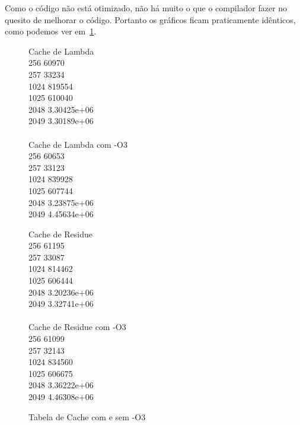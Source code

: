 \documentclass[12pt]{article}
\begin{document}
Como o código não está otimizado, não há muito o que o compilador fazer no 
quesito de melhorar o código. Portanto os gráficos ficam praticamente 
idênticos, como podemos ver em~\ref{fig:tabCache}.

\begin{figure}[ht]\footnotesize
\begin{tt}\noindent
\begin{multicols}{2}
    Cache de Lambda\\
    256     60970\\
    257     33234\\
    1024    819554\\
    1025    610040\\
    2048    3.30425e+06\\
    2049    3.30189e+06\\
\\
    Cache de Lambda com -O3\\
    256     60653\\
    257     33123\\
    1024    839928\\
    1025    607744\\
    2048    3.23875e+06\\
    2049    4.45634e+06\\
\end{multicols}
\begin{multicols}{2}
    Cache de Residue\\
    256     61195\\
    257     33087\\
    1024    814462\\
    1025    606444\\
    2048    3.20236e+06\\
    2049    3.32741e+06\\
\\
    Cache de Residue com -O3\\
    256     61099\\
    257     32143\\
    1024    834560\\
    1025    606675\\
    2048    3.36222e+06\\
    2049    4.46308e+06\\
\end{multicols}
\end{tt}\caption{Tabela de Cache com e sem -O3}\label{fig:tabCache}
\end{figure}
\end{document}
